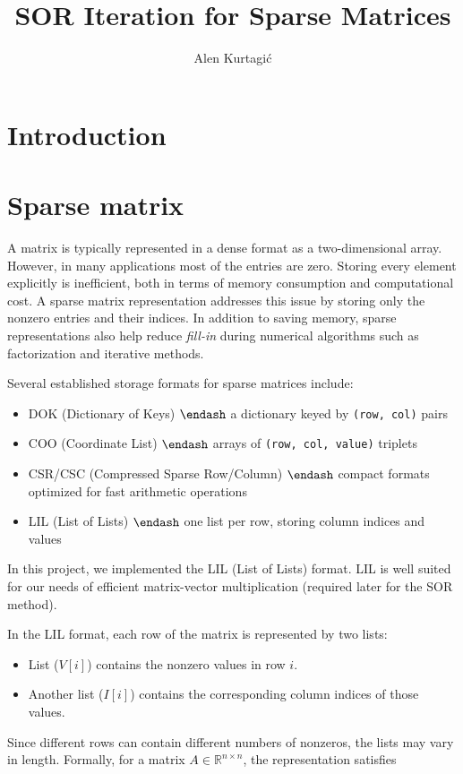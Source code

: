 \documentclass[12pt,a4paper]{article}
\title{ SOR Iteration for Sparse Matrices }
\author{ Alen Kurtagić }
\date{   }
\begin{document}
\maketitle

\section{Introduction}
\section{Sparse matrix}
A matrix is typically represented in a dense format as a two-dimensional array.   However, in many applications most of the entries are zero. Storing every element explicitly is inefficient, both in terms of memory consumption and computational cost.   A sparse matrix representation addresses this issue by storing only the nonzero entries and their indices.   In addition to saving memory, sparse representations also help reduce \emph{fill-in} during numerical algorithms such as factorization and iterative methods.

Several established storage formats for sparse matrices include:

\begin{itemize}
\item DOK (Dictionary of Keys) \ensuremath{\endash} a dictionary keyed by \texttt{(row, col)} pairs  


\item COO (Coordinate List) \ensuremath{\endash} arrays of \texttt{(row, col, value)} triplets  


\item CSR/CSC (Compressed Sparse Row/Column) \ensuremath{\endash} compact formats optimized for fast arithmetic operations  


\item LIL (List of Lists) \ensuremath{\endash} one list per row, storing column indices and values  

\end{itemize}
In this project, we implemented the LIL (List of Lists) format.  LIL is well suited for our needs of efficient matrix-vector multiplication (required later for the SOR method).

In the LIL format, each row of the matrix is represented by two lists:

\begin{itemize}
\item List ($V[i]$) contains the nonzero values in row $i$.  


\item Another list ($I[i]$) contains the corresponding column indices of those values.  

\end{itemize}
Since different rows can contain different numbers of nonzeros, the lists may vary in length.   Formally, for a matrix $A \in \mathbb{R}^{n \times n}$, the representation satisfies
\end{document}
